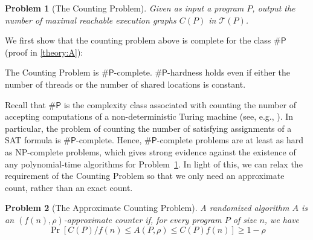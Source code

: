 \documentclass[acmsmall]{acmart}
\def\RM#1{{\textcolor{red}{\textbf{RM:} #1}}}
\def\MZ#1{{\textcolor{blue}{\textbf{MZ:} #1}}}
\renewcommand{\RM}[1]{}
\renewcommand{\MZ}[1]{}
\newtheorem{problem}{Problem}
\newcommand{\sharpP}{\#\mathsf{P}}
\begin{document}
\begin{problem}[The Counting Problem]
    \label{prob1}
    Given as input a program $P$, output the number of maximal reachable execution graphs $C(P)$ in $\mathcal{T}(P)$.
\end{problem}


We first show that the counting problem above is complete for the class $\sharpP$ (proof in \cref{theory:A}):
\begin{theorem}\label{thm:counting-problem-hardness}
   The Counting Problem is $\sharpP$-complete. 
   $\sharpP$-hardness holds even if either the number of threads or the number of shared locations is constant.
\end{theorem}


Recall that $\sharpP$ is the complexity class associated with counting the number
of accepting computations of a non-deterministic Turing machine (see, e.g., \cite{aroraBarak}). 
In particular, the problem of counting the number of satisfying assignments of a SAT formula is 
$\sharpP$-complete. 
Hence, $\sharpP$-complete problems are at least as hard as NP-complete problems, which 
gives strong evidence against the existence of any polynomial-time
algorithms for Problem~\ref{prob1}. 
In light of this, we can relax the requirement of the Counting Problem 
so that we only need an approximate count, rather than an exact count.



\begin{problem}[The Approximate Counting Problem]
    \label{prob2}
    A randomized algorithm $A$ is an $(f(n), \rho)$-approximate counter if, for every program $P$ of size $n$, we have
    \[
    \operatorname{Pr}[C(P)/f(n) \leq A(P, \rho) \leq C(P)f(n)] \geq 1 - \rho
    \]
\end{problem}
\end{document}
